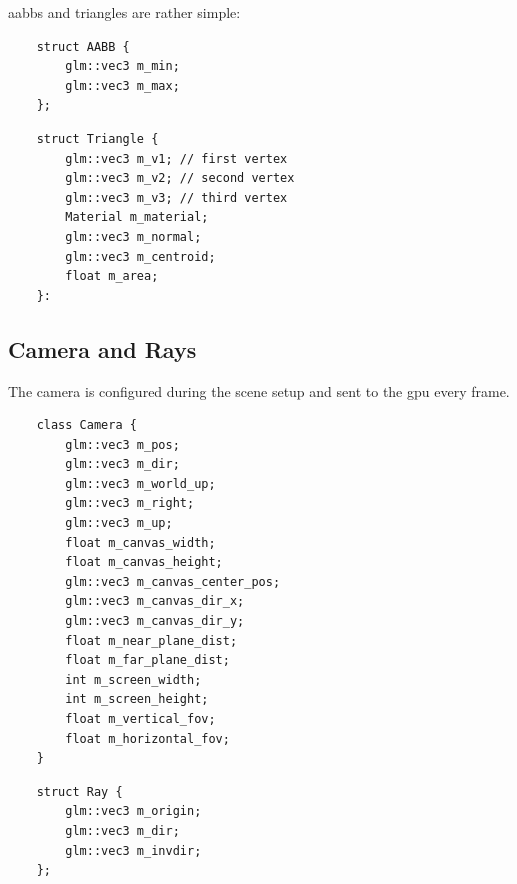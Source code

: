 \documentclass[
  twoside,
  11pt, a4paper,
  footinclude=true,
  headinclude=true,
  cleardoublepage=empty
]{scrreprt}
\begin{document}
\vspace{1cm}

\acp{aabb} and triangles are rather simple:

\begin{verbatim}
    struct AABB {
        glm::vec3 m_min;
        glm::vec3 m_max;
    };
\end{verbatim}
\begingroup
{}
\endgroup

\begin{verbatim}
    struct Triangle {
        glm::vec3 m_v1; // first vertex
        glm::vec3 m_v2; // second vertex
        glm::vec3 m_v3; // third vertex
        Material m_material;
        glm::vec3 m_normal;
        glm::vec3 m_centroid;
        float m_area;
    }:
\end{verbatim}
\begingroup
{}
\endgroup

\subsection{Camera and Rays}

The camera is configured during the scene setup and sent to the \ac{gpu} every frame.

\begin{verbatim}
    class Camera {
        glm::vec3 m_pos;
        glm::vec3 m_dir;
        glm::vec3 m_world_up;
        glm::vec3 m_right;
        glm::vec3 m_up;
        float m_canvas_width;
        float m_canvas_height;
        glm::vec3 m_canvas_center_pos;
        glm::vec3 m_canvas_dir_x;
        glm::vec3 m_canvas_dir_y;
        float m_near_plane_dist;
        float m_far_plane_dist;
        int m_screen_width;
        int m_screen_height;
        float m_vertical_fov;
        float m_horizontal_fov;
    }
\end{verbatim}
\begingroup
{}
\endgroup

\begin{verbatim}
    struct Ray {
        glm::vec3 m_origin;
        glm::vec3 m_dir;
        glm::vec3 m_invdir;
    };
\end{verbatim}
\begingroup
{}
\endgroup
\end{document}
